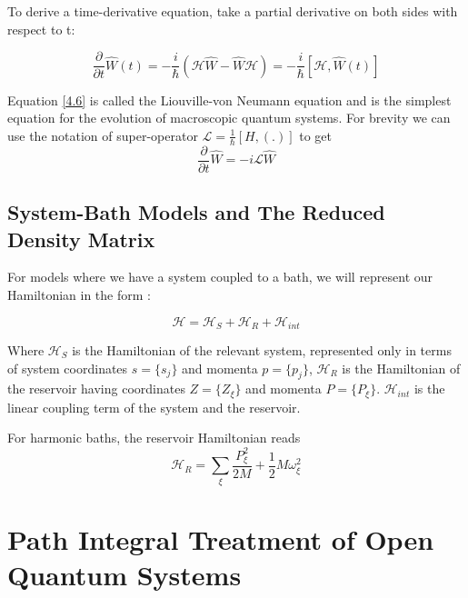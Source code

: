 To derive a time-derivative equation, take a partial derivative on both sides with respect to t:

\begin{equation} \label{4.6}
    \frac{\partial}{\partial t} \hat{W}(t) = -\frac{i}{\hbar}(\mathcal{H} \hat{W} - \hat{W} \mathcal{H}) = -\frac{i}{\hbar}[\mathcal{H}, \hat{W}(t)]
\end{equation}

Equation \ref{4.6} is called the Liouville-von Neumann equation and is the simplest equation for the evolution of macroscopic quantum systems. For brevity we can use the notation of super-operator $\mathcal{L} = \frac{1}{\hbar}[H, (.)]$ to get $$\frac{\partial}{\partial t} \hat{W} = -i \mathcal{L} \hat{W}$$

\subsection{System-Bath Models and The Reduced Density Matrix}

For models where we have a system coupled to a bath, we will represent our Hamiltonian in the form : 

\begin{equation} \label{4.7}
    \mathcal{H} = \mathcal{H}_S + \mathcal{H}_R + \mathcal{H}_{int}
\end{equation}

Where $\mathcal{H}_S$ is the Hamiltonian of the relevant system, represented only in terms of system coordinates $s = \{s_j\}$ and momenta $p = \{p_j\}$, $\mathcal{H}_R$ is the Hamiltonian of the reservoir having coordinates $Z = \{Z_{\xi}\}$ and momenta $P = \{P_{\xi}\}$. $\mathcal{H}_{int}$ is the linear coupling term of the system and the reservoir. 

For harmonic baths, the reservoir Hamiltonian reads $$\mathcal{H}_{R} = \sum_{\xi} \frac{P_{\xi}^2}{2M} + \frac{1}{2}M \omega_{\xi}^2$$





\section{Path Integral Treatment of Open Quantum Systems}

